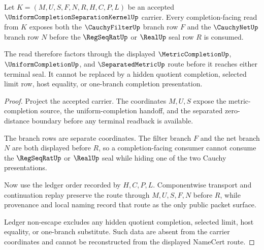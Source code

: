\begin{theorem}
\label{thm:uniform-completion-separation-kernel-filter-net-branch-visibility}
Let $K=(M,U,S,F,N,R,H,C,P,L)$ be an accepted $\UniformCompletionSeparationKernelUp$ carrier. Every completion-facing read from $K$ exposes both the $\CauchyFilterUp$ branch row $F$ and the $\CauchyNetUp$ branch row $N$ before the $\RegSeqRatUp$ or $\RealUp$ seal row $R$ is consumed.

The read therefore factors through the displayed $\MetricCompletionUp$, $\UniformCompletionUp$, and $\SeparatedMetricUp$ route before it reaches either terminal seal. It cannot be replaced by a hidden quotient completion, selected limit row, host equality, or one-branch completion presentation.
\end{theorem}
\begin{proof}
Project the accepted carrier. The coordinates $M,U,S$ expose the metric-completion source, the uniform-completion handoff, and the separated zero-distance boundary before any terminal readback is available.

The branch rows are separate coordinates. The filter branch $F$ and the net branch $N$ are both displayed before $R$, so a completion-facing consumer cannot consume the $\RegSeqRatUp$ or $\RealUp$ seal while hiding one of the two Cauchy presentations.

Now use the ledger order recorded by $H,C,P,L$. Componentwise transport and continuation replay preserve the route through $M,U,S,F,N$ before $R$, while provenance and local naming record that route as the only public packet surface.

Ledger non-escape excludes any hidden quotient completion, selected limit, host equality, or one-branch substitute. Such data are absent from the carrier coordinates and cannot be reconstructed from the displayed NameCert route.
\end{proof}


